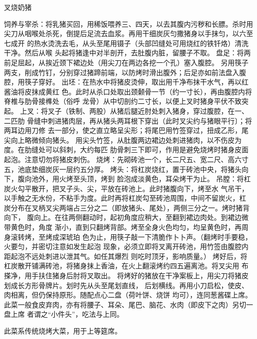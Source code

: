 \begin{recipe}{叉烧奶猪}

\ingredients


\preparation

\step 饲养与宰杀：将乳猪买回，用稀饭喂养三、四天，以去其腹内污秽和长膘。杀时用
尖刀从咽喉处杀死，倒提后足流去血浆。再用干细炭灰匀撒猪身以手抹匀，以六至七成开
的热水烫洗去毛，从头至尾用镊子（头部凹缝处可用烧红的铁钎烙）清洗干净。然后从喉
头起将猪逢中对半剖开，去肚腹内脏，留腰子不取。
\step 盘足：将两前足屈起，从挨近颈下裙边处（用尖刀在两边各挖一个孔）塞入腹腔。
另用筷子两支，削成竹钉，分别穿过猪蹄前端，以防烤时滑出腹外；后足亦如前法盘入腹
腔，用筷子穿好。
\step 出坯：在热水中将猪皮烫伸，取出用千净布抹干水气，再以红酱油将皮抹成黄红
色。此时从杀口处取出颈颡骨一节（约一寸长），再由腹腔内将脊椎与肋骨接榫处（俗呼
龙骨）从中切剖约二寸长，以便上叉时猪身平伏不致突起。
\step 上叉：将叉子（铁制、两股）从猪后腿近肘处刺入猪身，穿过腹腔，在一、二匹肋
骨缝中刺进猪肉层，再从猪头两耳根下穿出（此时叉尖约与猪眼平行〕；将两耳边用刀修
去一部分，使之直立略呈尖形；将尾巴用竹签穿过，扭成乙形，尾尖向上略微倾向猪头。
用尖头竹签，从肚腹两边裙边处刺进猪肉，以不伤皮为度。在肋缝处可以斜刺，大约每匹
肋骨刺三下即可，作用是避免烧烤时猪身皮面起泡。注意切勿将猪皮刺伤。
\step 烧烤：先砌砖池一个，长二尺五、宽二尺、高六寸五，池底垫细炭灰一层约五分厚。
\step 烤头：将杠炭烧红，置于砖池中央，将猪头向下，腹向池外，用火烤至头顶，烤到
脸泡成淡黄色，耳朵烤干为止。
\step 吊膛：将杠炭火勾平散开，把叉子头、尖，平放在砖池上。此时猪腹向下，烤至水
气吊干，以手触之无水份，不粘手为度。此时再将杠炭勾至砖池周围，中间不留炭火，杠
炭分布在叉柄叉尖两端占三分之二（即放猪头、尾处），两侧三分之一。烤时猪背向下，
腹向上。在往两侧翻动时，起初角度应稍大，至翻到裙边肉处。到裙边微带黄色时，角度
渐小，直到只翻烤背部。烤至全身火色均匀，均呈黄色时，再周身滚转烤，至烤成深琥珀
色为止，用筷子敲一下清脆作卜卜声。（翻烤时手要稳，火要匀，并密切注意如发生起泡
现象，必须立即将叉离开砖池，用竹签由腹腔内距起泡不远处刺进以泄其气。如任其爆烈
则吃时顶牙，影响质量。）
烤好后，将杠炭散开铺满砖池，将猪身抹上香油，在火上翻滚烤约四五遍离池。将叉尖用
布搽净，用手扶住猪身后肘将叉取出。
将烤好的猪放在干净案板上，用尖刀将猪皮划成长方形骨牌片。划时先从头至尾划直线，
后划横线。再用小刀启松，使皮、肉相离，但仍保持原形。随配点心二盘（荷叶饼、烧饼
均可），连同葱酱碟上席。
此菜一般食皮弃肉，亦有将腰子、耳朵、尾巴、脑花、水肉（即皮下之肉）另切一盘上席
者谓之“小件头”，吃法与上同。

\features

此菜系传统烧烤大菜，用于上等筵席。

\end{recipe}

